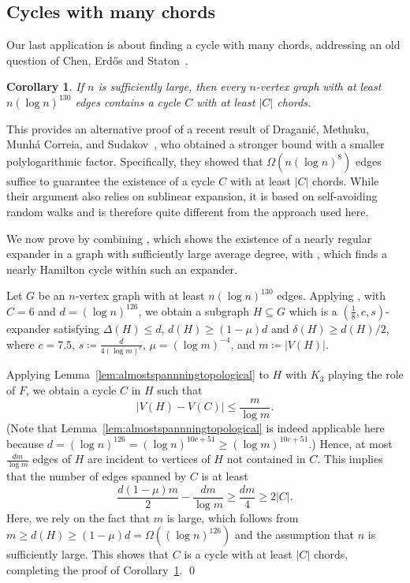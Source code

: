 \documentclass[10pt]{article}
\theoremstyle{plain}
\numberwithin{theorem}{section}
\newtheorem{corollary}[theorem]{Corollary}
\theoremstyle{definition}
\theoremstyle{remark}
\renewenvironment{proof}[1][]{\begin{trivlist}
\item[\hspace{\labelsep}{\bf\noindent Proof#1.\/}] }{\qed\end{trivlist}}
\renewcommand{\setminus}{-}
\theoremstyle{plain}
\begin{document}
\subsection{Cycles with many chords}
\label{subsec:cyclewithmanychords}

	Our last application is about finding a cycle with many chords, addressing an old question of Chen, Erd\H{o}s and Staton~\cite{chen1996proof}. 

\begin{corollary}
\label{cor:chords}
If $n$ is sufficiently large, then every $n$-vertex graph with at least $n(\log n)^{130}$ edges contains a cycle $C$ with at least $|C|$ chords.
\end{corollary}

This provides an alternative proof of a recent result of Dragani\'c, Methuku, Munh\'a Correia, 
and Sudakov~\cite{draganic2023cycles}, who obtained a stronger bound with a smaller 
polylogarithmic factor. Specifically, they showed that $\Omega(n(\log n)^8)$ edges suffice to 
guarantee the existence of a cycle $C$ with at least $|C|$ chords. 
While their argument also relies on sublinear expansion, it is based on self-avoiding 
random walks and is therefore quite different from the approach used here.


We now prove  by combining , which shows the existence of a nearly regular expander in a graph with sufficiently large average degree, with , which finds a nearly Hamilton cycle within such an expander.

\begin{proof}[ of Corollary~\ref{cor:chords}]
	Let $G$ be an $n$-vertex graph with at least $n(\log n)^{130}$ edges. 
	Applying , with $C = 6$ and $d = (\log n)^{126}$, we obtain a subgraph $H \subseteq G$ which is a $(\frac{1}{8}, c, s)$-expander satisfying $\Delta(H) \le d$, $d(H) \ge (1 - \mu)d$ and $\delta(H) \ge d(H)/2$, where $c = 7.5$, $s \coloneqq \frac{d}{4 (\log m)^c}$, $\mu = (\log m)^{-4}$,  and $m \coloneqq |V(H)|$.

	Applying Lemma~\ref{lem:almostspannningtopological} to $H$ with $K_3$ playing the role of $F$, we obtain a cycle $C$ in $H$ such that 
	\begin{equation*}
		|V(H) \setminus V(C)| \le \frac{m}{\log m}.
	\end{equation*}
	(Note that Lemma~\ref{lem:almostspannningtopological} is indeed applicable here because $d = (\log n)^{126} = (\log n)^{10c + 51} \ge (\log m)^{10 c + 51}$.) Hence, at most $\frac{dm}{\log m}$ edges of $H$ are incident to vertices of $H$ not contained in $C$. This implies that the number of edges spanned by $C$ is at least
	\begin{equation*}
		\frac{d(1-\mu)m}{2} - \frac{dm}{\log m} 
		\ge  \frac{dm}{4} \ge  2|C|.
	\end{equation*}
	Here, we rely on the fact that $m$ is large, which follows from $m \ge d(H) \ge (1 - \mu)d = \Omega((\log n)^{126})$ and the assumption that $n$ is sufficiently large.
	This shows that $C$ is a cycle with at least $|C|$ chords, completing the proof of Corollary~\ref{cor:chords}.
\end{proof}
\end{document}

